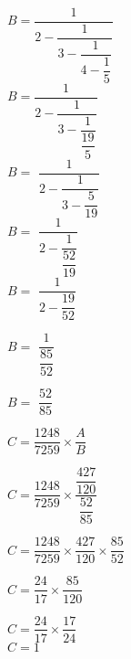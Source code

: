 \begin{minipage}{0.29\textwidth}
$ B = ${$ \dfrac {1}{2-\dfrac{1}{3-\dfrac{1}{4-\dfrac{1}{5}}}} $} \\


$ B = ${$\dfrac{1}{2-\dfrac{1}{3-\dfrac{1}{\dfrac{19}{5}}}} $ }\\


$ B = ${  $\dfrac{1}{2-\dfrac{1}{3-\dfrac{5}{19}}} $ }\\


$ B = ${  $\dfrac{1}{2-\dfrac{1}{\dfrac{52}{19}}} $ }\\


$ B = ${  $\dfrac{1}{2-\dfrac{19}{52}} $ }\\

\vspace{.5cm}

$ B = ${  $\dfrac{1}{\dfrac{85}{52}} $ }\\

\vspace{.5cm}

$ B = ${  $\dfrac{52}{85} $ }\\

\end{minipage}
\begin{minipage}{0.29\textwidth}
$ C = \dfrac{1248}{7259} \times \dfrac{A}{B} $ \\

\vspace{.5cm}

$ C = \dfrac{1248}{7259} \times \dfrac{\dfrac{427}{120}}{\dfrac{52}{85}} $ \\

\vspace{.5cm}

$ C = \dfrac{1248}{7259} \times \dfrac{427}{120} \times \dfrac{85}{52} $ \\

\vspace{.5cm}

$ C = \dfrac{24}{17} \times \dfrac{85}{120} $ \\

\vspace{.5cm}

$ C = \dfrac{24}{17} \times \dfrac{17}{24} $ \\

$ C = 1 $ \\
\end{minipage}

